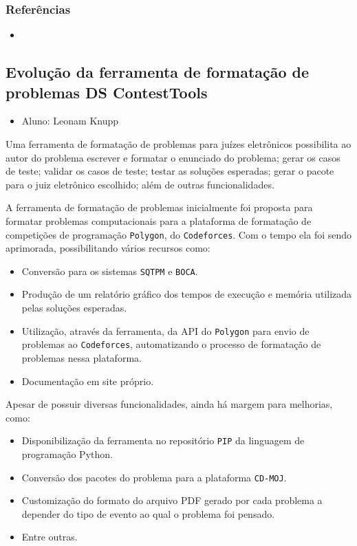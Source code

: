 \documentclass{article}
\newcommand*{\nsubsection}[1]{
    \subsection{#1}
}
\newcommand{\polygon}{\texttt{Polygon}\xspace}
\newcommand{\codeforces}{\texttt{Codeforces}\xspace}
\newcommand{\sqtpm}{\texttt{SQTPM}\xspace}
\newcommand{\boca}{\texttt{BOCA}\xspace}
\newcommand{\pip}{\texttt{PIP}\xspace}
\newcommand{\cdmoj}{\texttt{CD-MOJ}\xspace}
\begin{document}
\subsubsection*{Referências}

\begin{itemize}
	\item {}
\end{itemize}


\nsubsection{Evolução da ferramenta de formatação de problemas DS ContestTools}


\begin{itemize}
	\item Aluno: Leonam Knupp
\end{itemize}


Uma ferramenta de formatação de problemas para juízes eletrônicos possibilita ao autor do problema escrever e formatar o enunciado do problema; gerar os casos de teste; validar os casos de teste; testar as soluções esperadas;  gerar o pacote para o juiz eletrônico escolhido; além de outras funcionalidades.

A ferramenta de formatação de problemas  inicialmente foi proposta para formatar problemas computacionais para a plataforma de formatação de competições de programação \polygon, do \codeforces. Com o tempo ela foi sendo aprimorada, possibilitando vários recursos como:

\begin{itemize}
	\item Conversão para os sistemas \sqtpm e \boca.
	\item Produção de um relatório gráfico dos tempos de execução e memória utilizada pelas soluções esperadas.
	\item Utilização, através da ferramenta, da API do \polygon para envio de problemas ao \codeforces, automatizando o processo de formatação de problemas nessa plataforma.
	\item Documentação em site próprio.
\end{itemize}

Apesar de possuir diversas funcionalidades, ainda há margem para melhorias, como:

\begin{itemize}
	\item Disponibilização da ferramenta no repositório \pip da linguagem de programação Python.
	\item Conversão dos pacotes do problema para a plataforma \cdmoj.
	\item Customização do formato do arquivo PDF gerado por cada problema a depender do tipo de evento ao qual o problema foi pensado.
	\item Entre outras.
\end{itemize}
\end{document}
